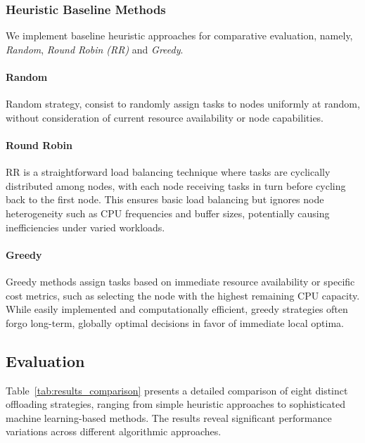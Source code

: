 \documentclass[preprint,3p,authoryear]{elsarticle}
\begin{document}
\subsubsection{Heuristic Baseline Methods}
We implement baseline heuristic approaches for comparative evaluation, namely, \emph{Random}, \emph{Round Robin (RR)} and \emph{Greedy}.

\paragraph{Random}
Random strategy, consist to randomly assign tasks to nodes uniformly at random, without consideration of current resource availability or node capabilities.

\paragraph{Round Robin}
RR is a straightforward load balancing technique where tasks are cyclically distributed among nodes, with each node receiving tasks in turn before cycling back to the first node. This ensures basic load balancing but ignores node heterogeneity such as CPU frequencies and buffer sizes, potentially causing inefficiencies under varied workloads. 

\paragraph{Greedy}
Greedy methods assign tasks based on immediate resource availability or specific cost metrics, such as selecting the node with the highest remaining CPU capacity. While easily implemented and computationally efficient, greedy strategies often forgo long-term, globally optimal decisions in favor of immediate local optima.



\subsection{Evaluation}

Table~\ref{tab:results_comparison} presents a detailed comparison of eight distinct offloading strategies, ranging from simple heuristic approaches to sophisticated machine learning-based methods. The results reveal significant performance variations across different algorithmic approaches.
\end{document}
